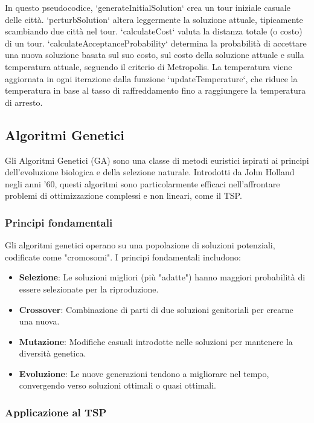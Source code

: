 In questo pseudocodice, `generateInitialSolution` crea un tour iniziale casuale delle città. `perturbSolution` altera leggermente la soluzione attuale, tipicamente scambiando due città nel tour. `calculateCost` valuta la distanza totale (o costo) di un tour. `calculateAcceptanceProbability` determina la probabilità di accettare una nuova soluzione basata sul suo costo, sul costo della soluzione attuale e sulla temperatura attuale, seguendo il criterio di Metropolis. La temperatura viene aggiornata in ogni iterazione dalla funzione `updateTemperature`, che riduce la temperatura in base al tasso di raffreddamento fino a raggiungere la temperatura di arresto.

\subsection{Algoritmi Genetici}

Gli Algoritmi Genetici (\gls{GA}) sono una classe di metodi euristici ispirati ai principi dell'evoluzione biologica e della selezione naturale. Introdotti da John Holland negli anni '60, questi algoritmi sono particolarmente efficaci nell'affrontare problemi di ottimizzazione complessi e non lineari, come il \gls{TSP}.

\subsubsection{Principi fondamentali}

Gli algoritmi genetici operano su una popolazione di soluzioni potenziali, codificate come "cromosomi". I principi fondamentali includono:

\begin{itemize}
	\item \textbf{Selezione}: Le soluzioni migliori (più "adatte") hanno maggiori probabilità di essere selezionate per la riproduzione.
	\item \textbf{Crossover}: Combinazione di parti di due soluzioni genitoriali per crearne una nuova.
	\item \textbf{Mutazione}: Modifiche casuali introdotte nelle soluzioni per mantenere la diversità genetica.
	\item \textbf{Evoluzione}: Le nuove generazioni tendono a migliorare nel tempo, convergendo verso soluzioni ottimali o quasi ottimali.
\end{itemize}

\subsubsection{Applicazione al \gls{TSP}}

